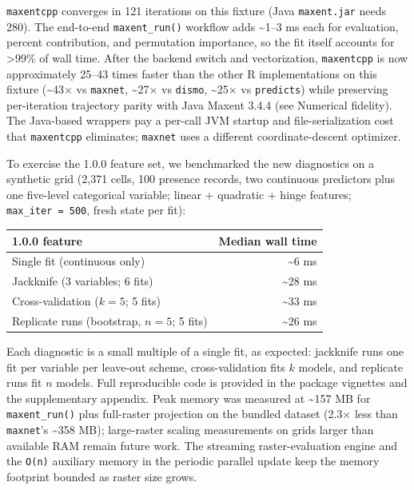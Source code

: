 \documentclass[10pt,letterpaper]{article}
\begin{document}
\texttt{maxentcpp} converges in 121 iterations on this fixture (Java
\texttt{maxent.jar} needs 280). The end-to-end \texttt{maxent\_run()}
workflow adds \textasciitilde1--3 ms each for evaluation, percent
contribution, and permutation importance, so the fit itself accounts for
\textgreater99\% of wall time. After the backend switch and
vectorization, \texttt{maxentcpp} is now approximately 25--43 times
faster than the other R implementations on this fixture
(\textasciitilde43\(\times\) vs \texttt{maxnet},
\textasciitilde27\(\times\) vs \texttt{dismo},
\textasciitilde25\(\times\) vs \texttt{predicts}) while preserving
per-iteration trajectory parity with Java Maxent 3.4.4 (see Numerical
fidelity). The Java-based wrappers pay a per-call JVM startup and
file-serialization cost that \texttt{maxentcpp} eliminates;
\texttt{maxnet} uses a different coordinate-descent optimizer.

To exercise the 1.0.0 feature set, we benchmarked the new diagnostics on
a synthetic grid (2,371 cells, 100 presence records, two continuous
predictors plus one five-level categorical variable; linear + quadratic
+ hinge features; \texttt{max\_iter\ =\ 500}, fresh state per fit):

\begin{longtable}[]{@{}lr@{}}
\toprule\noalign{}
1.0.0 feature & Median wall time \\
\midrule\noalign{}
\endhead
\bottomrule\noalign{}
\endlastfoot
Single fit (continuous only) & \textasciitilde6 ms \\
Jackknife (3 variables; 6 fits) & \textasciitilde28 ms \\
Cross-validation (\(k = 5\); 5 fits) & \textasciitilde33 ms \\
Replicate runs (bootstrap, \(n = 5\); 5 fits) & \textasciitilde26 ms \\
\end{longtable}

Each diagnostic is a small multiple of a single fit, as expected:
jackknife runs one fit per variable per leave-out scheme,
cross-validation fits \(k\) models, and replicate runs fit \(n\) models.
Full reproducible code is provided in the package vignettes and the
supplementary appendix. Peak memory was measured at \textasciitilde157
MB for \texttt{maxent\_run()} plus full-raster projection on the bundled
dataset (2.3\(\times\) less than \texttt{maxnet}'s \textasciitilde358
MB); large-raster scaling measurements on grids larger than available
RAM remain future work. The streaming raster-evaluation engine and the
\texttt{O(n)} auxiliary memory in the periodic parallel update keep the
memory footprint bounded as raster size grows.
\end{document}

